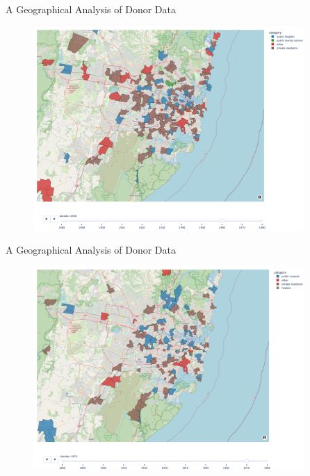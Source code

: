 \documentclass[]{beamer}
\begin{document}
\begin{frame}{A Geographical Analysis of Donor Data}
	\begin{figure}
		\includegraphics[width=0.92\textwidth]{img/choropleth_time/choropleth-9.png}
	\end{figure}
\end{frame}

\begin{frame}{A Geographical Analysis of Donor Data}
	\begin{figure}
		\includegraphics[width=0.92\textwidth]{img/choropleth_time/choropleth-10.png}
	\end{figure}
\end{frame}
\end{document}
